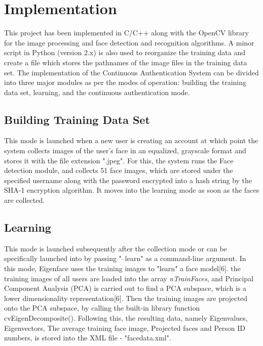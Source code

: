 \documentclass[12pt]{article}			%
\begin{document}

\section{ Implementation }  
This project has been implemented in C/C++ along with the OpenCV library for the image processing and face detection and recognition algorithms. A minor script in Python (version 2.x) is also used to reorganize the training data and create a file which stores the pathnames of the image files in the training data set. The implementation of the Continuous Authentication System can be divided into three major modules as per the modes of operation: building the training data set, learning, and the continuous authentication mode.
\subsection { Building Training Data Set }
This mode is launched when a new user is creating an account at which point the system collects images of the user's face in an equalized, grayscale format and stores it with the file extension ".jpeg". For this, the system runs the Face detection module, and collects 51 face images, which are stored under the specified username along with the password encrypted into a hash string by the SHA-1 encryption algorithm. It moves into the learning mode as soon as the faces are collected. 
\subsection { Learning }
This mode is launched subsequently after the collection mode or can be specifically launched into by passing "--learn" as a command-line argument. In this mode, Eigenface uses the training images to "learn" a face model[6]. the training images of all users are loaded into the array \emph {nTrainFaces}, and Principal Component Analysis (PCA) is carried out to find a PCA subspace, which is a lower dimensionality representation[6]. Then the training images are projected onto the PCA subspace, by calling the built-in library function cvEigenDecomposite(). Following this, the resulting data, namely Eigenvalues, Eigenvectors, The average training face image, Projected faces and Person ID numbers, is stored into the XML file - "facedata.xml".    
\end{document}
